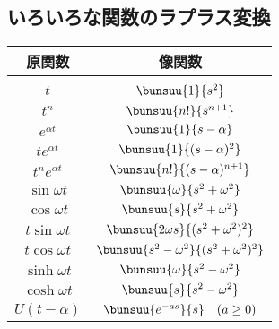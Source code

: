 \subsection{いろいろな関数のラプラス変換}

\begin{table}[H]
	\centering
	\begin{tabular}{c|c}
		\hline
		\hspace*{6\zw}\textsf{原関数}\hspace*{6\zw} & \hspace*{6\zw}\textsf{像関数}\hspace*{6\zw}\\
		\hline
		\raisebox{-1mm}{$1$} & \raisebox{-1mm}{$\bunsuu{1}{s}$}\\[4mm]
		$t$ & $\bunsuu{1}{s^2}$\\[3mm]
		$t^n$ & $\bunsuu{n!}{s^{n + 1}}$\\[3mm]
		$e^{\alpha t}$ & $\bunsuu{1}{s - \alpha}$\\[3mm]
		$te^{\alpha t}$ & $\bunsuu{1}{(s - \alpha)^2}$\\[3mm]
		$t^n e^{\alpha t}$ & $\bunsuu{n!}{(s - \alpha)^{n + 1}}$\\[3mm]
		$\sin \omega t$ & $\bunsuu{\omega}{s^2 + \omega^2}$\\[3mm]
		$\cos \omega t$ & $\bunsuu{s}{s^2 + \omega^2}$\\[3mm]
		$t\sin \omega t$ & $\bunsuu{2\omega s}{(s^2 + \omega^2)^2}$\\[3mm]
		$t\cos \omega t$ & $\bunsuu{s^2 - \omega^2}{(s^2 + \omega^2)^2}$\\[3mm]
		$\sinh \omega t$ & $\bunsuu{\omega}{s^2 - \omega^2}$\\[3mm]
		$\cosh \omega t$ & $\bunsuu{s}{s^2 - \omega^2}$\\[3mm]
		$U(t - \alpha)$ & $\bunsuu{e^{-as}}{s} \quad (a \ge 0)$\\[3mm]
		\hline
	\end{tabular}
\end{table}